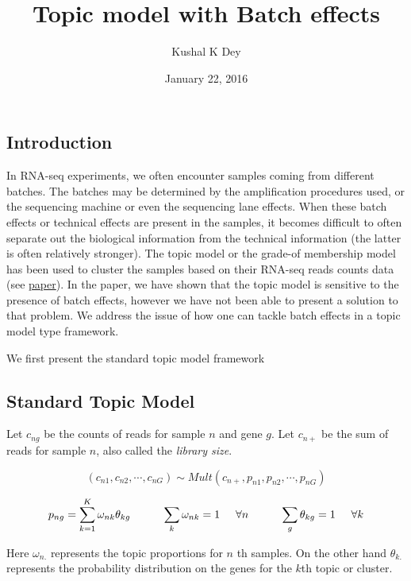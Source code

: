 \documentclass[]{article}
\title{Topic model with Batch effects}
\author{Kushal K Dey}
\date{January 22, 2016}
\begin{document}
\maketitle


\subsection{Introduction}\label{introduction}

In RNA-seq experiments, we often encounter samples coming from different
batches. The batches may be determined by the amplification procedures
used, or the sequencing machine or even the sequencing lane effects.
When these batch effects or technical effects are present in the
samples, it becomes difficult to often separate out the biological
information from the technical information (the latter is often
relatively stronger). The topic model or the grade-of membership model
has been used to cluster the samples based on their RNA-seq reads counts
data (see
\href{https://github.com/stephenslab/count-clustering/blob/master/docs/main.pdf}{paper}).
In the paper, we have shown that the topic model is sensitive to the
presence of batch effects, however we have not been able to present a
solution to that problem. We address the issue of how one can tackle
batch effects in a topic model type framework.

We first present the standard topic model framework

\subsection{Standard Topic Model}\label{standard-topic-model}

Let \(c_{ng}\) be the counts of reads for sample \(n\) and gene \(g\).
Let \(c_{n+}\) be the sum of reads for sample \(n\), also called the
\emph{library size}.

\[ (c_{n1}, c_{n2}, \cdots, c_{nG}) \sim Mult (c_{n+}, p_{n1}, p_{n2}, \cdots, p_{nG})  \]

\[ p_{ng} = \sum_{k=1}^{K} \omega_{nk} \theta_{kg} \hspace{1 cm} \sum_{k} \omega_{nk} =1 \hspace{0.5 cm} \forall n \hspace{1 cm} \sum_{g} \theta_{kg} =1 \hspace{0.5 cm} \forall k\]

Here \(\omega_{n.}\) represents the topic proportions for \(n\) th
samples. On the other hand \(\theta_{k.}\) represents the probability
distribution on the genes for the \(k\)th topic or cluster.
\end{document}
